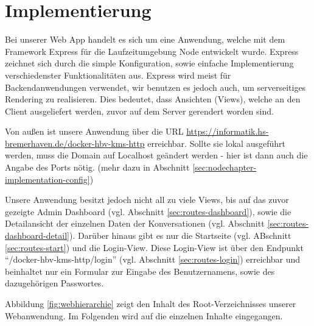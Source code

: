 
\newpage
\section{Implementierung}
\label{sec:nodechapter-implementation}
Bei unserer Web App handelt es sich um eine Anwendung, welche mit dem Framework Express für die Laufzeitumgebung
Node entwickelt wurde. Express zeichnet sich durch die simple Konfiguration, sowie einfache Implementierung
verschiedenster Funktionalitäten aus. Express wird meist für Backendanwendungen verwendet, wir benutzen es jedoch auch,
um serverseitiges Rendering zu realisieren. Dies bedeutet, dass Ansichten (Views), welche an den Client ausgeliefert werden,
zuvor auf dem Server gerendert worden sind.

Von außen ist unsere Anwendung über die URL
\href{https://informatik.hs-bremerhaven.de/docker-hbv-kms-http}{https://informatik.hs-bremerhaven.de/docker-hbv-kms-http}
erreichbar. Sollte sie lokal ausgeführt werden, muss die Domain auf Localhost geändert werden - hier ist dann auch die Angabe
des Ports nötig. (mehr dazu in Abschnitt \ref{sec:nodechapter-implementation-config})


Unsere Anwendung besitzt jedoch nicht all zu viele Views, bis auf das zuvor gezeigte Admin Dashboard (vgl. Abschnitt \ref{sec:routes-dashboard}), sowie
die Detailansicht der einzelnen Daten der Konversationen (vgl. Abschnitt \ref{sec:routes-dashboard-detail}). Darüber hinaus gibt es nur
die Startseite (vgl. ABschnitt \ref{sec:routes-start}) und die Login-View. Diese Login-View ist über den Endpunkt ``/docker-hbv-kms-http/login'' (vgl. Abschnitt \ref{sec:routes-login}) erreichbar und beinhaltet nur ein Formular zur Eingabe des
Benutzernamens, sowie des dazugehörigen Passwortes.


Abbildung \ref{fig:webhierarchie} zeigt den Inhalt des Root-Verzeichnisses unserer Webanwendung.
Im Folgenden wird auf die einzelnen Inhalte eingegangen. \\

